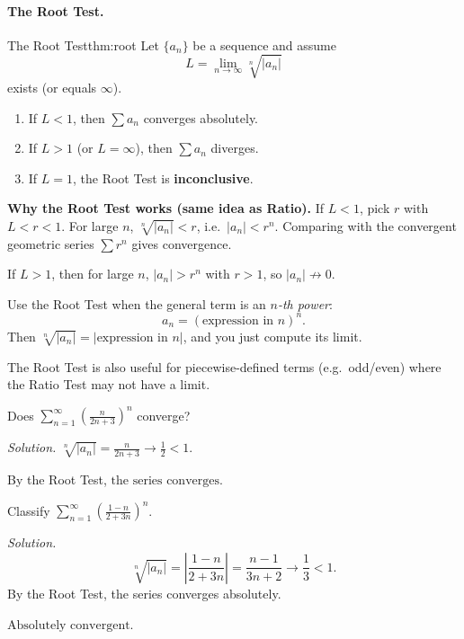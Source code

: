 \paragraph{The Root Test.}

\begin{theorem}{The Root Test}{thm:root}
Let $\{a_n\}$ be a sequence and assume
\[
L=\lim_{n\to\infty}\sqrt[n]{|a_n|}
\]
exists (or equals $\infty$).
\begin{enumerate}[label=(\roman*), leftmargin=3em]
\item If $L<1$, then $\sum a_n$ converges absolutely.
\item If $L>1$ (or $L=\infty$), then $\sum a_n$ diverges.
\item If $L=1$, the Root Test is \textbf{inconclusive}.
\end{enumerate}
\end{theorem}

\noindent
\textbf{Why the Root Test works (same idea as Ratio).}
If $L<1$, pick $r$ with $L<r<1$. For large $n$, $\sqrt[n]{|a_n|}<r$, i.e.\ $|a_n|<r^n$. Comparing with the convergent geometric series $\sum r^n$ gives convergence.

If $L>1$, then for large $n$, $|a_n|>r^n$ with $r>1$, so $|a_n|\not\to 0$.

\begin{examtip}[title={Exam Focus: When to use the Root Test}]
Use the Root Test when the general term is an \emph{$n$-th power}:
\[
a_n=\left(\text{expression in }n\right)^n.
\]
Then $\sqrt[n]{|a_n|}=|\text{expression in }n|$, and you just compute its limit.

The Root Test is also useful for piecewise-defined terms (e.g.\ odd/even) where the Ratio Test may not have a limit.
\end{examtip}

\begin{examplebox}[title={Worked Example (Lecture Example 5.18): Root Test on $n$-th power}]
Does $\displaystyle\sum_{n=1}^{\infty}\left(\frac{n}{2n+3}\right)^n$ converge?

\emph{Solution.}
$\sqrt[n]{|a_n|}=\frac{n}{2n+3}\to\frac{1}{2}<1$.

By the Root Test, $\displaystyle\boxed{\text{the series converges}}$.
\end{examplebox}

\begin{examplebox}[title={Worked Example (Tutorial 10, Q1(c)): Root Test for $\left(\frac{1-n}{2+3n}\right)^n$}]
Classify $\displaystyle\sum_{n=1}^{\infty}\left(\frac{1-n}{2+3n}\right)^n$.

\emph{Solution.}
\[
\sqrt[n]{|a_n|}=\left|\frac{1-n}{2+3n}\right|=\frac{n-1}{3n+2}\to\frac{1}{3}<1.
\]
By the Root Test, the series converges absolutely.

$\displaystyle\boxed{\text{Absolutely convergent.}}$
\end{examplebox}

